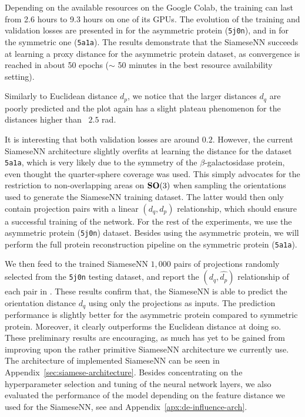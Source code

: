 Depending on the available resources on the Google Colab, the training can last from 2.6 hours to 9.3 hours on one of its GPUs.
The evolution of the training and validation losses are presented in  for the asymmetric protein (\texttt{5j0n}), and in  for the symmetric one (\texttt{5a1a}).
The results demonstrate that the SiameseNN succeeds at learning a proxy distance for the asymmetric protein dataset, as convergence is reached in about 50 epochs ($\sim$ 50 minutes in the best resource availability setting).

Similarly to Euclidean distance $d_p$, we notice that the larger distances $d_q$ are poorly predicted and the plot again has a slight plateau phenomenon for the distances higher than ~$2.5$ rad.

It is interesting that both validation losses are around $0.2$.
However, the current SiameseNN architecture slightly overfits at learning the distance for the dataset \texttt{5a1a}, which is very likely due to the symmetry of the $\beta$-galactosidase protein, even thought the quarter-sphere coverage was used.
This simply advocates for the restriction to non-overlapping areas on $\mathrm{\mathbf{SO}}(3)$ when sampling the orientations used to generate the SiameseNN training dataset.
The latter would then only contain projection pairs with a linear $(d_q,d_p)$ relationship, which should ensure a successful training of the network.
For the rest of the experiments, we use the asymmetric protein (\texttt{5j0n}) dataset.
Besides using the asymmetric protein, we will perform the full protein reconstruction pipeline on the symmetric protein (\texttt{5a1a}).

We then feed to the trained SiameseNN $1,000$ pairs of projections randomly selected from the \texttt{5j0n} testing dataset, and report the $(d_q,\widehat{d_p})$ relationship of each pair in .
These results confirm that, the SiameseNN is able to predict the orientation distance $d_q$ using only the projections as inputs. The prediction performance is slightly better for the asymmetric protein compared to symmetric protein.
Moreover, it clearly outperforms the Euclidean distance at doing so.
These preliminary results are encouraging, as much has yet to be gained from improving upon the rather primitive SiameseNN architecture we currently use. The architecture of implemented SiameseNN can be seen in Appendix~\ref{sec:siamese-architecture}. Besides concentrating on the hyperparameter selection and tuning of the neural network layers, we also evaluated the performance of the model depending on the feature distance we used for the SiameseNN, see and Appendix~\ref{apx:de-influence-arch}.

